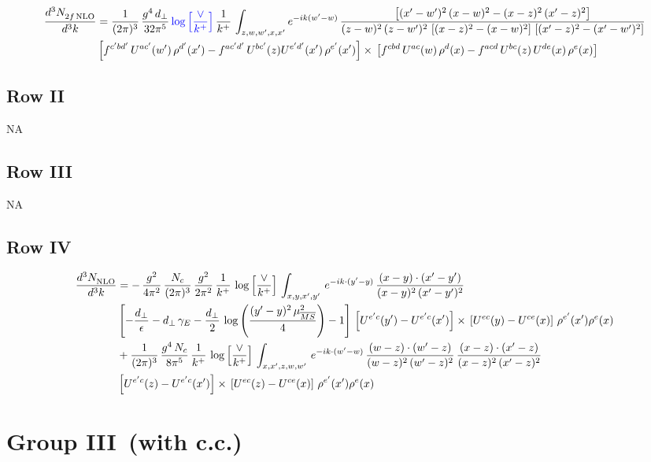\documentclass[9pt]{article}
\numberwithin{equation}{section}
\begin{document}
\begin{align}
    \frac{d^{3}N_{2f\,\rm NLO}^{\rm}}{d^{3}k}  & = \frac{1}{(2\pi)^{3}}\, \frac{g^{4}\,d_{\perp}}{32\pi^{5}}\,{\color{blue}\log{\left[\frac{\vee}{k^{+}}\right]}}\,\frac{1}{k^{+}}\,\int_{z,w,w^{\prime},x,x'} e^{-ik(w^{\prime}-w)}\,\frac{\left[(x'-w')^{2}\, (x-w)^{2} - (x-z)^{2}\, (x'-z)^{2}\right]}{(z-w)^{2}\, (z-w')^{2}\,\left[(x-z)^{2} - (x-w)^{2}\right]\, \left[(x'-z)^{2} - (x'-w')^{2}\right]}\notag \\ &   \left[f^{c'bd'}\, U^{ac'}(w')\,\rho^{d'}(x')-f^{ac'd'}\, U^{bc'}(z)U^{e'd'}(x')\, \rho^{e'}(x')\right]\times\, \left[f^{cbd}\, U^{ac}(w)\,\rho^{d}(x) - f^{acd}\, U^{bc}(z)\,U^{de}(x)\, \rho^{e}(x)\right]
\end{align}    
\subsection{Row II}
\textsc{NA}
\subsection{Row III}
\textsc{NA}
\subsection{Row IV}
\begin{align}
\frac{d^{3}N_{\rm NLO}^{\rm}}{d^{3}k}  & = -\,\frac{g^{2}}{4\pi^{2}}\, \frac{N_{c}}{(2\pi)^{3}}\,\frac{g^{2}}{2\pi^{2}}\, \frac{1}{k^{+}}\,\log{\left[\frac{\vee}{k^{+}}\right]}\,\int_{x,y,x',y'}\,e^{-ik\cdot (y'-y)}\,\frac{(x-y)\cdot (x'-y')}{(x-y)^{2}\,(x'-y')^{2}}\notag \\
& \left[-\frac{d_{\perp}}{\epsilon}-d_{\perp}\,\gamma_{E}-\frac{d_{\perp}}{2}\,\log{\left(\frac{(y'-y)^{2}\,\mu^{2}_{\overline{MS}}}{4}\right)}-1\right]\,\left[U^{e'c}(y') - U^{e'c}(x')\right] \times\, \left[U^{ec}(y) - U^{ce}(x)\right]\, \rho^{e'}(x') \rho^{e}(x)\notag \\
& +\frac{1}{(2\pi)^{3}}\,\frac{g^{4}\,N_{c}}{8\pi^{5}}\,\frac{1}{k^{+}}\,\log{\left[\frac{\vee}{k^{+}}\right]}\,\int_{x,x',z,w,w'}\,e^{-ik\cdot (w'-w)}\,\frac{(w-z)\cdot(w'-z)}{(w-z)^{2}\,(w'-z)^{2}}\,\frac{(x-z)\cdot(x'-z)}{(x-z)^{2}\,(x'-z)^{2}}\notag \\
& \left[U^{e'c}(z) - U^{e'c}(x')\right] \times\, \left[U^{ec}(z) - U^{ce}(x)\right]\, \rho^{e'}(x') \rho^{e}(x)
\end{align}
\section{Group III\, (with c.c.)}
\end{document}
